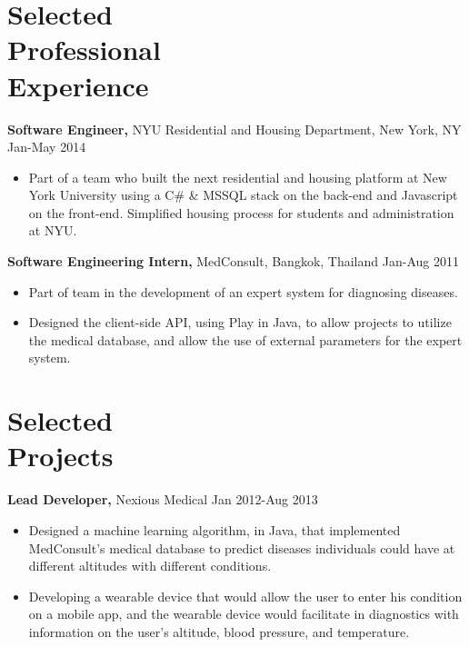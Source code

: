 \documentclass[margin]{res}
\begin{document}
 
\begin{resume}
 
\section{Selected \\ Professional \\ Experience}

{\bf Software Engineer,} NYU Residential and Housing Department, New York, NY \hfill Jan-May 2014
 \begin{itemize} \itemsep -2pt
 \item Part of a team who built the next residential and housing platform at New York University using a C\# \& MSSQL stack on the back-end and Javascript on the front-end. Simplified housing process for students and administration at NYU.
 \end{itemize}

 {\bf Software Engineering Intern,} MedConsult, Bangkok, Thailand \hfill Jan-Aug 2011
 \begin{itemize} \itemsep -2pt
 \item Part of team in the development of an expert system for diagnosing diseases.
 \item Designed the client-side API, using Play in Java, to allow projects to utilize the medical database, and allow the use of external parameters for the expert system.
 \end{itemize}
 
\section{Selected \\ Projects}
 {\bf Lead Developer,} Nexious Medical \hfill Jan 2012-Aug 2013
 \begin{itemize} \itemsep -2pt
 \item Designed a machine learning algorithm, in Java, that implemented MedConsult's medical database to predict diseases individuals could have at different altitudes with different conditions.
 \item Developing a wearable device that would allow the user to enter his condition on a mobile app, and the wearable device would facilitate in diagnostics with information on the user's altitude, blood pressure, and temperature.
 \end{itemize}
 

\end{resume}
\end{document}
